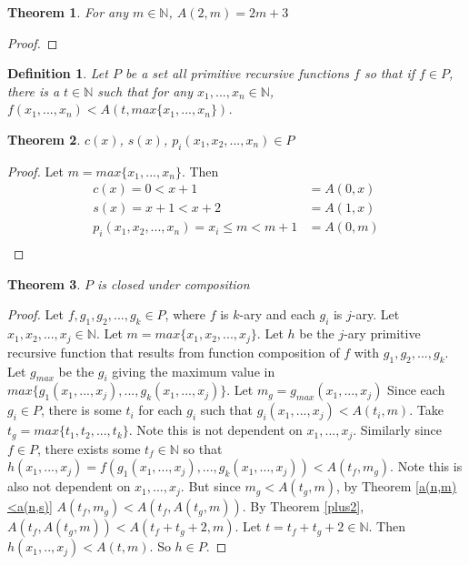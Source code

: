 \documentclass[12pt, letterpaper]{article}
\newtheorem{theorem}{Theorem}
\newtheorem*{definition}{Definition}
\theoremstyle{case}
\begin{document}
    \begin{theorem}
      \label{a(2,m)=2m+3}
      For any $m \in \mathbb{N}$, $A(2, m) = 2m + 3$
    \end{theorem}
    \begin{proof}
    \end{proof}

    
    \begin{definition}
      Let $P$ be a set all primitive recursive functions $f$ so that if $f \in P$, there is a $t \in \mathbb{N}$
      such that for any $x_1, ..., x_n \in \mathbb{N}$, $f(x_1, ..., x_n) < A(t, max\{x_1, ..., x_n\})$.
    \end{definition}

    \begin{theorem}
      $c(x)$, $s(x)$, $p_i(x_1, x_2, ..., x_n) \in P$
    \end{theorem}
    \begin{proof}
      Let $m = max\{x_1, ..., x_n\}$.
      Then
      \begin{equation*}
        \begin{aligned}
          c(x) = 0 < x + 1 &= A(0, x) \\
          s(x) = x + 1 < x + 2 &= A(1, x) \\
          p_i(x_1, x_2, ..., x_n) = x_i \leq m < m + 1 &= A(0, m) \\
        \end{aligned}
      \end{equation*}
    \end{proof}

    \begin{theorem}
      $P$ is closed under composition
    \end{theorem}
    \begin{proof}
      Let $f, g_1, g_2, ..., g_k \in P$, where $f$ is $k$-ary and each $g_i$ is $j$-ary.
      Let $x_1, x_2, ..., x_j \in \mathbb{N}$.
      Let $m = max\{x_1, x_2, ..., x_j\}$.
      Let $h$ be the $j$-ary primitive recursive function that results from function composition of $f$ with $g_1, g_2, ..., g_k$.
      Let $g_{max}$ be the $g_i$ giving the maximum value in $max\{g_1(x_1, ..., x_j), ..., g_k(x_1, ..., x_j)\}$.
      Let $m_g = g_{max}(x_1, ..., x_j)$
      Since each $g_i \in P$, there is some $t_i$ for each $g_i$ such that $g_i(x_1, ..., x_j) < A(t_i, m)$.
      Take $t_g = max\{t_1, t_2, ..., t_k\}$. Note this is not dependent on $x_1, ..., x_j$.
      Similarly since $f \in P$, there exists some $t_f \in \mathbb{N}$ so that $h(x_1, ..., x_j) = f(g_1(x_1, ..., x_j), ..., g_k(x_1, ..., x_j)) < A(t_f, m_g)$.
      Note this is also not dependent on $x_1, ..., x_j$.
      But since $m_g < A(t_g, m)$, by Theorem \ref{a(n,m)<a(n,s)} $A(t_f, m_g) < A(t_f, A(t_g, m))$.
      By Theorem \ref{plus2}, $A(t_f, A(t_g, m)) < A(t_f + t_g + 2, m)$.
      Let $t = t_f + t_g + 2 \in \mathbb{N}$.
      Then $h(x_1, .., x_j) < A(t, m)$.
      So $h \in P$.
    \end{proof}
\end{document}
